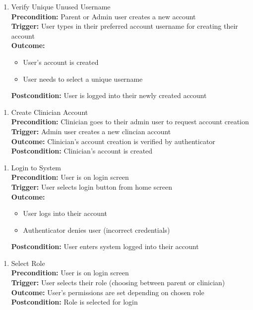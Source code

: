 \documentclass[12pt]{article}
\begin{document}
\begin{enumerate}[{PUC-}02. ]
  \item Verify Unique Unused Username\\
  \textbf{Precondition: }Parent or Admin user creates a new account\\
  \textbf{Trigger: }User types in their preferred account username for creating their account\\
  \textbf{Outcome: }
  \begin{itemize}
  \item User's account is created
  \item User needs to select a unique username
  \end{itemize}
  \textbf{Postcondition: }User is logged into their newly created account\\
\end{enumerate}

\begin{enumerate}[{PUC-}03. ]
  \item Create Clinician Account\\
  \textbf{Precondition: }Clinician goes to their admin user to request account creation\\
  \textbf{Trigger: }Admin user creates a new clincian account\\
  \textbf{Outcome: }Clinician's account creation is verified by authenticator\\
  \textbf{Postcondition: }Clinician's account is created\\
\end{enumerate}

\begin{enumerate}[{PUC-}04. ]
  \item Login to System\\
  \textbf{Precondition: }User is on login screen\\
  \textbf{Trigger: }User selects login button from home screen\\
  \textbf{Outcome: }
  \begin{itemize}
    \item User logs into their account
    \item Authenticator denies user (incorrect credentials)
  \end{itemize}
  \textbf{Postcondition: }User enters system logged into their account\\
\end{enumerate}

\begin{enumerate}[{PUC-}05. ]
  \item Select Role\\
  \textbf{Precondition: }User is on login screen\\
  \textbf{Trigger: }User selects their role (choosing between parent or clinician)\\
  \textbf{Outcome: }User's permissions are set depending on chosen role\\
  \textbf{Postcondition: }Role is selected for login\\
\end{enumerate}
\end{document}
